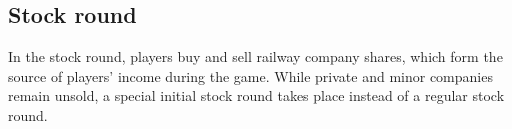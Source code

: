 \documentclass{article}
\begin{document}
\begin{CJK}{UTF8}{min}












\section{Stock round}
In the stock round, players buy and sell railway company shares, which
form the source of players' income during the game. While private and
minor companies remain unsold, a special initial stock round takes
place instead of a regular stock round.


\end{CJK}
\end{document}
